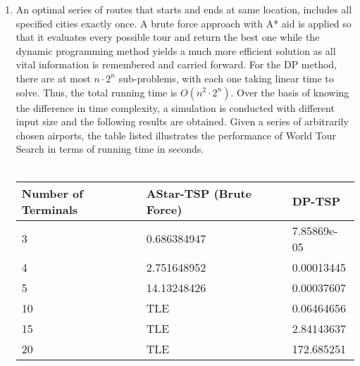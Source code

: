 \documentclass[fontsize=11pt]{article}
\begin{document}
\begin{enumerate}
\begin{enumerate}
{\begin{tabular}{ |p{3.1cm}|p{4.1cm}|}
            \hline
            \end{tabular}}\\
            \item An optimal series of routes that starts and ends at same location, includes all specified cities exactly once. A brute force approach with A* aid is applied so that it evaluates every possible tour and return the best one while the dynamic programming method yields a much more efficient solution as all vital information is remembered and carried forward. For the DP method, there are at most $n\cdot 2^n$ sub-problems, with each one taking linear time to solve. Thus, the total running time is $O(n^2\cdot2^n)$. Over the basis of knowing the difference in time complexity, a simulation is conducted with different input size and the following results are obtained. Given a series of arbitrarily chosen airports, the table listed illustrates the performance of World Tour Search in terms of running time in seconds.\\\\
            \begin{tabular}{ |p{4.1cm}|p{4.1cm}|p{4.1cm}|}
            \hline
            Number of Terminals & AStar-TSP (Brute Force) & DP-TSP\\
            \hline
            3 & 0.686384947 & 7.85869e-05\\
            \hline
            4 & 2.751648952 & 0.00013445\\
            \hline
            5 & 14.13248426 & 0.00037607\\
            \hline
            10 & TLE & 0.06464656\\
            \hline
            15 & TLE & 2.84143637\\
            \hline
            20 & TLE & 172.685251\\
            \hline
            \end{tabular}
        \end{enumerate}
        
        


\end{enumerate}
\end{document}
